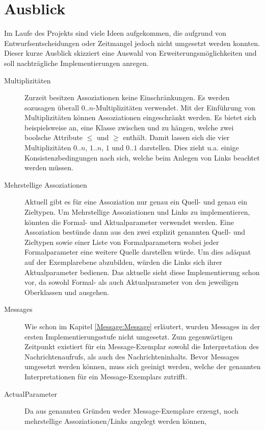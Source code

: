 \section{Ausblick}
Im Laufe des Projekts sind viele Ideen aufgekommen, die aufgrund von Entwurfsentscheidungen oder Zeitmangel 
jedoch nicht umgesetzt werden konnten. Dieser kurze Ausblick skizziert eine Auswahl von Erweiterungsmöglichkeiten und 
soll nachträgliche Implementierungen anregen.

\begin{description}
  \item[Multiplizitäten] Zurzeit besitzen Assoziationen keine Einschränkungen. 
Es werden sozusagen überall $0..n$-Multiplizitäten verwendet. 
Mit der Einführung von Multiplizitäten können Assoziationen eingeschränkt werden.
Es bietet sich beispielsweise an, eine Klasse  zwischen  und  zu hängen,
welche zwei boolsche Attribute $\leq$ und $\geq$ enthält. 
Damit lassen sich die vier Multiplizitäten $0..n$, $1..n$, $1$ und $0..1$ darstellen.
Dies zieht u.a. einige Konsistenzbedingungen nach sich, welche beim Anlegen von Links beachtet werden müssen. 
  \item[Mehrstellige Assoziationen] Aktuell gibt es für eine Assoziation nur genau ein Quell- und genau ein Zieltypen. 
  Um Mehrstellige Assoziationen und Links zu implementieren, könnten die Formal- und Aktualparameter verwendet werden. 
  Eine Assoziation bestünde dann aus den zwei explizit genannten Quell- und Zieltypen sowie einer Liste von Formalparametern 
  wobei jeder Formalparameter eine weitere Quelle darstellen würde. Um dies adäquat auf der Exemplarebene abzubilden, 
  würden die Links sich ihrer Aktualparameter bedienen. Das aktuelle \MM sieht diese Implementierung schon vor, da sowohl 
  Formal- als auch Aktualparameter von den jeweiligen Oberklassen  und  ausgehen.
  \item[Messages] Wie schon im Kapitel \ref{Message:Message} erläutert, wurden Messages in der ersten Implementierungsstufe nicht umgesetzt. 
  Zum gegenwärtigen Zeitpunkt existiert für ein Message-Exemplar sowohl die Interpretation des Nachrichtenaufrufs, als auch des Nachrichteninhalts.
Bevor Messages umgesetzt werden können, muss sich geeinigt werden, welche der genannten Interpretationen für ein Message-Exemplars zutrifft. 
  \item[ActualParameter] Da aus genannten Gründen weder Message-Exemplare erzeugt, noch mehrstellige Assoziationen/Links angelegt werden können, 

\end{description}
